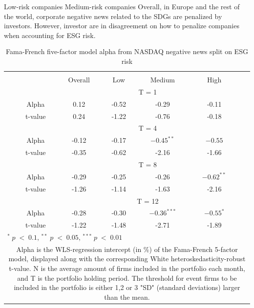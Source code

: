 Low-risk companies 
Medium-risk companies 
Overall, in Europe and the rest of the world, corporate negative news related to the SDGs are penalized by investors. However, investor are in disagreement on how to penalize companies when accounting for ESG risk.  
\setlength{\tabcolsep}{15pt}
\begin{table}[H]
\small
\centering
\caption{Fama-French five-factor model alpha from NASDAQ negative news split on ESG risk} 
\begin{tabular}{ccccccc}
\hline \hline \\ 
 &     & Overall &    Low  &  Medium  &  High &  \\    \cline{3-6} 
& &  \multicolumn{4}{c}{ T = 1} & \\ \cline{2-6}
& Alpha  & 0.12 & -0.52  & -0.29  & -0.11 &  \\ 
& t-value   & 0.24 & -1.22 & -0.76  & -0.18 &  \\
& &  \multicolumn{4}{c}{ T = 4} & \\ \cline{2-6}
& Alpha & -0.12 & -0.17  & $-0.45^{**}$  &  $-0.55$ & \\
& t-value &   -0.35 & -0.62 & -2.16  & -1.66 & \\
& &  \multicolumn{4}{c}{ T = 8} & \\ \cline{2-6}
& Alpha & -0.29 & -0.25  & -0.26  & $-0.62^{**}$ &  \\
& t-value &   -1.26 & -1.14  & -1.63 & -2.16&  \\
& &  \multicolumn{4}{c}{ T = 12} & \\ \cline{2-6}
& Alpha  & -0.28 & -0.30  & $-0.36^{***}$  & $-0.55^{*}$ &  \\
& t-value &    -1.22 & -1.48  & -2.71 & -1.89 &  \\
\hline \hline
 \multicolumn{7}{l}{ \footnotesize $^* \; p\; <\; 0.1$, $ ^{**} \; p\; <\; 0.05$, $ ^{***} \; p\; <\; 0.01$  } \\
 \multicolumn{7}{p{11.5cm}}{ \footnotesize Alpha is the WLS-regression intercept (in \%) of the Fama-French 5-factor model, displayed along with the corresponding White heteroskedasticity-robust t-value. N is the average amount of firms included in the portfolio each month, and T is the portfolio holding period. The threshold for event firms to be included in the portfolio is either 1,2 or 3 "SD" (standard deviations) larger than the mean.} \\ 
 \hline
\end{tabular}
\label{tab: FF5_neg_nasdaq}
\end{table}